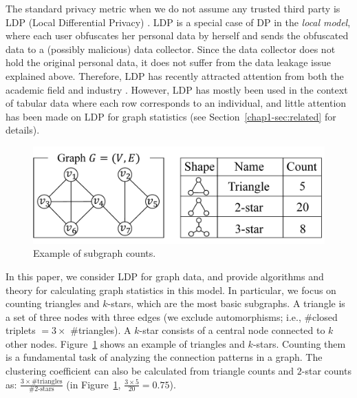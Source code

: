 The standard privacy metric when we do not assume any trusted third party is LDP (Local Differential Privacy) \cite{Duchi_FOCS13,Kasiviswanathan_FOCS08}. 
LDP is a special case of DP in the \textit{local model}, where each user obfuscates her personal data by herself and sends the obfuscated data to a (possibly malicious) data collector. 
Since the data collector does not hold the original personal data, it does not suffer from the data leakage issue explained above. 
Therefore, LDP has recently attracted attention from both the academic field \cite{Acharya_AISTATS19,Bassily_STOC15,Bassily_NIPS17,Fanti_PoPETs16,Kairouz_ICML16,Kairouz_JMLR16,Murakami_USENIX19,Qin_CCS16,Wang_USENIX17,Ye_ISIT17} and industry \cite{Erlingsson_CCS14,Ding_NIPS17,Thakurta_USPatent17}. 
However, LDP has mostly been used in the context of tabular data where each row corresponds to an individual, and little attention has been made on LDP for graph statistics (see 
Section~\ref{chap1-sec:related} for details). 

\begin{figure}
\centering
\includegraphics[width=0.9\linewidth]{fig/subgraph.pdf}

\caption{Example of subgraph counts.}
\label{chap1-fig:subgraph}
\end{figure}

In this paper, we consider LDP for graph data, and 
provide algorithms and theory 
for calculating graph statistics in this model. 
In particular, we focus on counting triangles and $k$-stars, which are the most basic subgraphs. 
A triangle is a set of three nodes with three edges (we exclude automorphisms; i.e., \#closed triplets $= 3 \times$ \#triangles). 
A $k$-star consists of a central node connected to $k$ other nodes. 
Figure~\ref{chap1-fig:subgraph} shows an example of triangles and $k$-stars. 
Counting them is a fundamental task of analyzing the connection patterns in a graph. 
The clustering coefficient can also be calculated from triangle counts and $2$-star counts as: $\frac{3 \times \text{\#triangles}}{\#2\text{-stars}}$ (in Figure~\ref{chap1-fig:subgraph}, $\frac{3 \times 5}{20} = 0.75$). 

